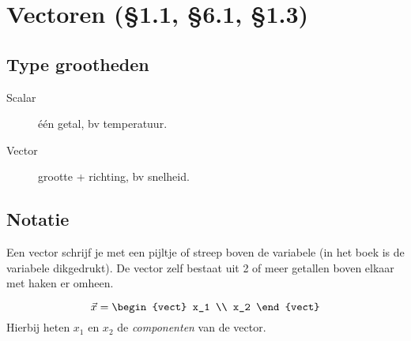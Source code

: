 \section{Vectoren (\S 1.1, \S 6.1, \S 1.3)}
\subsection{Type grootheden}
\begin{description}
\item[Scalar]  \'e\'en getal, bv temperatuur.
\item[Vector] grootte + richting, bv snelheid.
\end{description}

\subsection{Notatie}
Een vector schrijf je met een pijltje of streep boven de variabele (in het boek is de variabele dikgedrukt). De vector zelf bestaat uit 2 of meer getallen boven elkaar met haken er omheen.

\[ \vec{x} = \begin{vect} x_1 \\ x_2 \end{vect} \]
Hierbij heten $x_1$ en $x_2$ de \emph{componenten}  van de vector.

